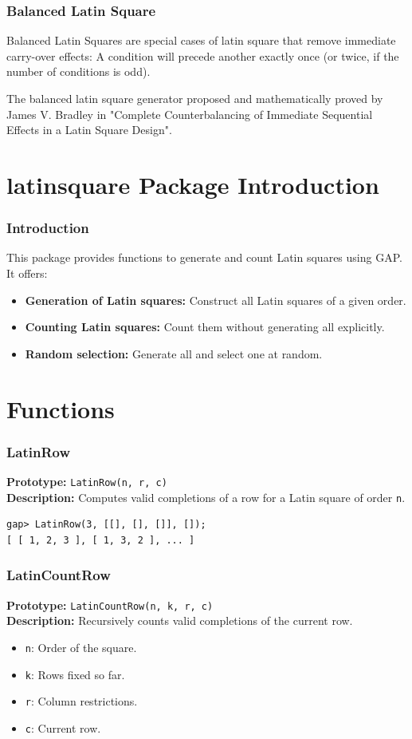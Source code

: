 \documentclass{beamer}
\begin{document}
\begin{frame}
\frametitle{Balanced Latin Square}
Balanced Latin Squares are special cases of latin square that remove immediate carry-over effects: A condition will precede another exactly once (or twice, if the number of conditions is odd).

The balanced latin square generator proposed and mathematically proved by James V. Bradley in "Complete Counterbalancing of Immediate Sequential Effects in a Latin Square Design".
\end{frame}

\section{latinsquare Package Introduction}
\begin{frame}
\frametitle{Introduction}
This package provides functions to generate and count Latin squares using GAP. It offers:
\begin{itemize}
  \item \textbf{Generation of Latin squares:} Construct all Latin squares of a given order.
  \item \textbf{Counting Latin squares:} Count them without generating all explicitly.
  \item \textbf{Random selection:} Generate all and select one at random.
\end{itemize}
\end{frame}

\section{Functions}
\begin{frame}[fragile]
\frametitle{LatinRow}
\textbf{Prototype:} \texttt{LatinRow(n, r, c)}\\
\textbf{Description:} Computes valid completions of a row for a Latin square of order \texttt{n}.
\begin{lstlisting}
gap> LatinRow(3, [[], [], []], []);
[ [ 1, 2, 3 ], [ 1, 3, 2 ], ... ]
\end{lstlisting}
\end{frame}

\begin{frame}[fragile]
\frametitle{LatinCountRow}
\textbf{Prototype:} \texttt{LatinCountRow(n, k, r, c)}\\
\textbf{Description:} Recursively counts valid completions of the current row.
\begin{itemize}
  \item \texttt{n}: Order of the square.
  \item \texttt{k}: Rows fixed so far.
  \item \texttt{r}: Column restrictions.
  \item \texttt{c}: Current row.
\end{itemize}
\end{frame}
\end{document}
